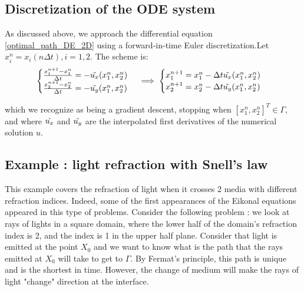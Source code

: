 \documentclass[11pt]{article}
\theoremstyle{definition}
\theoremstyle{remark}
\begin{document}
\subsection{Discretization of the ODE system}
As discussed above, we approach the differential equation \ref{optimal_path_DE_2D} using a forward-in-time Euler discretization.Let $x_i^{n}=x_i(n\Delta t), i=1,2$. The scheme is:
\begin{equation}
    \begin{cases}
        \frac{x_1^{n+1}-x_1^n}{\Delta t}=-\Tilde{u_x}(x_1^n,x_2^n) \\
        \frac{x_2^{n+1}-x_2^n}{\Delta t}=-\Tilde{u_y}(x_1^n,x_2^n)
    \end{cases} \implies
    \begin{cases}
        x_1^{n+1} = x_1^n-\Delta t\Tilde{u_x}(x_1^n,x_2^n) \\
        x_2^{n+1} = x_2^n-\Delta t\Tilde{u_y}(x_1^n,x_2^n)
    \end{cases}
\end{equation}

\noindent which we recognize as being a gradient descent, stopping when $[x_1^n,x_2^n]^T\in \Gamma$, and where $\Tilde{u_x}$ and $\Tilde{u_y}$ are the interpolated first derivatives of the numerical solution $u$.

\subsection{Example : light refraction with Snell's law}
This example covers the refraction of light when it crosses 2 media with different refraction indices. Indeed, some of the first appearances of the Eikonal equations appeared in this type of problems. Consider the following problem : we look at rays of lights in a square domain, where the lower half of the domain's refraction index is 2, and the index is 1 in the upper half plane. Consider that light is emitted at the point $X_0$ and we want to know what is the path that the rays emitted at $X_0$ will take to get to $\Gamma$. By Fermat's principle, this path is unique and is the shortest in time. However, the change of medium will make the rays of light "change" direction at the interface. \\
\end{document}
